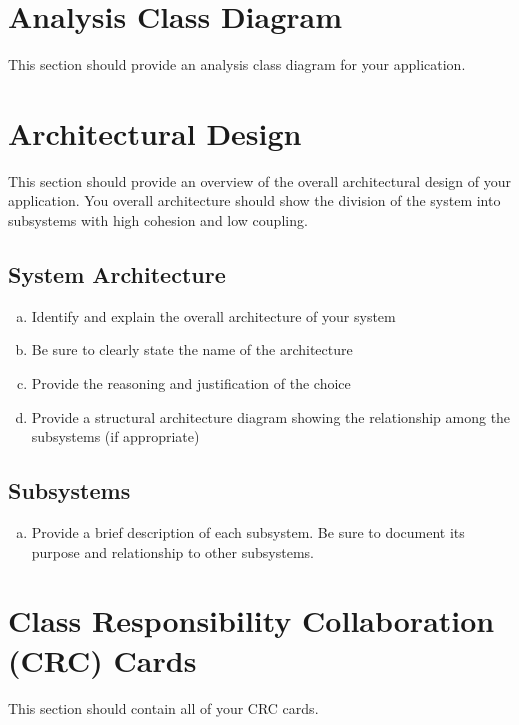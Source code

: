 \documentclass[12pt]{article}
\begin{document}
\section{Analysis Class Diagram}
\label{sec:analysis_class_diagram}
This section should provide an analysis class diagram for your application.


\section{Architectural Design}
\label{sec:architectural_design}
This section should provide an overview of the overall architectural design of your application. You overall architecture should show the division of the system into subsystems with high cohesion and low coupling.

\subsection{System Architecture}
\label{sub:system_architecture}
\begin{enumerate}[a)]
	\item Identify and explain the overall architecture of your system
	\item Be sure to clearly state the name of the architecture
	\item Provide the reasoning and justification of the choice
	\item Provide a structural architecture diagram showing the relationship among the subsystems (if appropriate)
\end{enumerate}

\subsection{Subsystems}
\label{sub:subsystems}
\begin{enumerate}[a)]
	\item Provide a brief description of each subsystem. Be sure to document its purpose and relationship to other subsystems.
\end{enumerate}

	
\section{Class Responsibility Collaboration (CRC) Cards}
\label{sec:class_responsibility_collaboration_crc_cards}
This section should contain all of your CRC cards.
\end{document}
